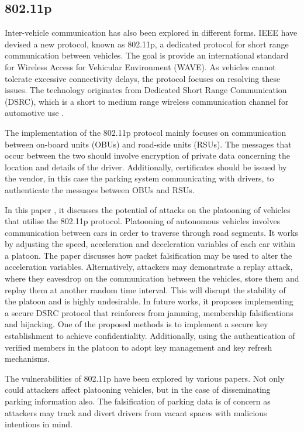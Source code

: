 \subsection{802.11p}
Inter-vehicle communication has also been explored in different forms. IEEE have devised a new protocol, known as 802.11p, a dedicated protocol for short range communication between vehicles. The goal is provide an international standard for Wireless Access for Vehicular Environment (WAVE). As vehicles cannot tolerate excessive connectivity delays, the protocol focuses on resolving these issues. The technology originates from Dedicated Short Range Communication (DSRC), which is a short to medium range wireless communication channel for automotive use \cite{dsrc}.

The implementation of the 802.11p protocol mainly focuses on communication between on-board units (OBUs) and road-side units (RSUs). The messages that occur between the two should involve encryption of private data concerning the location and details of the driver. Additionally, certificates should be issued by the vendor, in this case the parking system communicating with drivers, to authenticate the messages between OBUs and RSUs.

In this paper \cite{ucar_security_2016}, it discusses the potential of attacks on the platooning of vehicles that utilise the 802.11p protocol. Platooning of autonomous vehicles involves communication between cars in order to traverse through road segments. It works by adjusting the speed, acceleration and deceleration variables of each car within a platoon. The paper discusses how packet falsification may be used to alter the acceleration variables. Alternatively, attackers may demonstrate a replay attack, where they eavesdrop on the communication between the vehicles, store them and replay them at another random time interval. This will disrupt the stability of the platoon and is highly undesirable. In future works, it proposes implementing a secure DSRC protocol that reinforces from jamming, membership falsifications and hijacking. One of the proposed methods is to implement a secure key establishment to achieve confidentiality. Additionally, using the authentication of verified members in the platoon to adopt key management and key refresh mechanisms.

The vulnerabilities of 802.11p have been explored by various papers. Not only could attackers affect platooning vehicles, but in the case of disseminating parking information also. The falsification of parking data is of concern as attackers may track and divert drivers from vacant spaces with malicious intentions in mind.